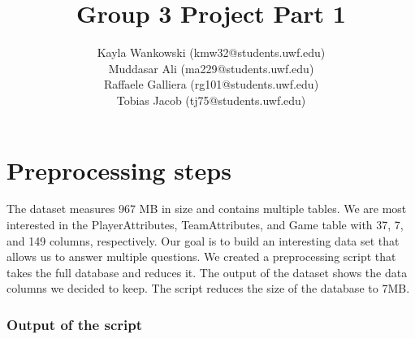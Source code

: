 \documentclass{article}
\begin{document}
\title{Group 3 Project Part 1}
\author{
    Kayla Wankowski (kmw32@students.uwf.edu)\\
    Muddasar Ali (ma229@students.uwf.edu)\\
    Raffaele Galliera (rg101@students.uwf.edu)\\
    Tobias Jacob (tj75@students.uwf.edu)
}

\maketitle

\section{Preprocessing steps}
The dataset measures 967 MB in size and contains multiple tables.
We are most interested in the PlayerAttributes, TeamAttributes, and Game table with 37, 7, and 149 columns, respectively.
Our goal is to build an interesting data set that allows us to answer multiple questions.
We created a preprocessing script that takes the full database and reduces it.
The output of the dataset shows the data columns we decided to keep.
The script reduces the size of the database to 7MB.

\subsubsection*{Output of the script}
\end{document}

